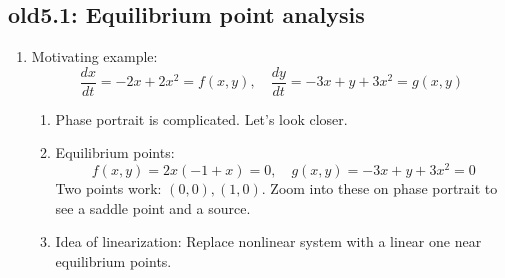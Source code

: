 \documentclass{article}
\begin{document}
\subsection{old5.1: Equilibrium point analysis}

\begin{enumerate}

\item Motivating example:
\[
\frac{dx}{dt} = -2x+2x^2 = f(x,y), \quad \frac{dy}{dt}=-3x+y+3x^2 = g(x,y)
\]
\begin{enumerate}
\item Phase portrait is complicated. Let's look closer.
\item Equilibrium points:
\[
f(x,y)=2x(-1+x)=0, \quad g(x,y)=-3x+y+3x^2=0
\]
Two points work: $(0,0), (1,0)$. Zoom into these on phase portrait to see a saddle point and a source.
\item Idea of linearization: Replace nonlinear system with a linear one near equilibrium points.
\end{enumerate}


\end{enumerate}
\end{document}
